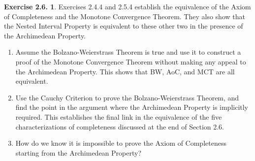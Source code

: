 \documentclass[12pt]{article}
\theoremstyle{definition}
\theoremstyle{exercise}
\newtheorem{exercise}{Exercise 2.6.}
\theoremstyle{solution}
\begin{document}
\begin{exercise}
\label{ex:7}
    Exercises 2.4.4 and 2.5.4 establish the equivalence of the Axiom of Completeness and the Monotone Convergence Theorem. They also show that the Nested Interval Property is equivalent to these other two in the presence of the Archimedean Property.
    \begin{enumerate}
        \item Assume the Bolzano-Weierstrass Theorem is true and use it to construct a proof of the Monotone Convergence Theorem without making any appeal to the Archimedean Property. This shows that BW, AoC, and MCT are all equivalent.

        \item Use the Cauchy Criterion to prove the Bolzano-Weierstrass Theorem, and find the point in the argument where the Archimedean Property is implicitly required. This establishes the final link in the equivalence of the five characterizations of completeness discussed at the end of Section 2.6.

        \item How do we know it is impossible to prove the Axiom of Completeness starting from the Archimedean Property?
    \end{enumerate}
\end{exercise}
\end{document}
